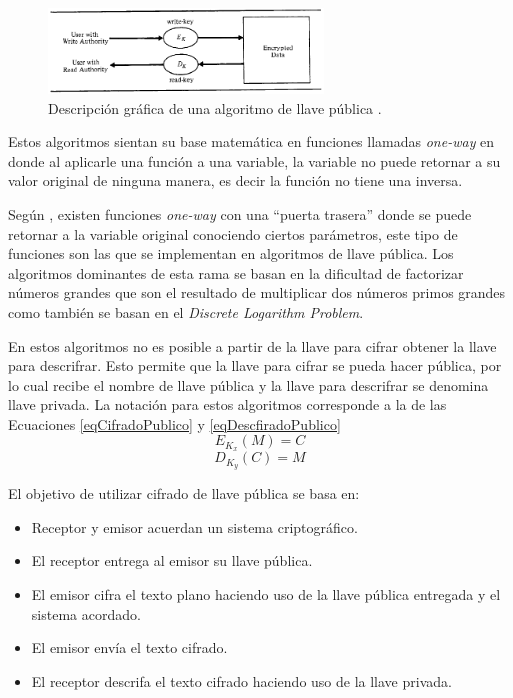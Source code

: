 \begin{figure}
	\centering
	\includegraphics[width=0.65\textwidth]{./images/figPublicKeyAlgorithm}
	\caption{Descripción gráfica de una algoritmo de llave pública \citep{denning}.}
	\label{figPublicKeyAlgorithm}
\end{figure}

Estos algoritmos sientan su base matemática en funciones llamadas \textit{one-way} en donde al aplicarle una función a una variable, la variable no puede retornar a su valor original de ninguna manera, es decir la función no tiene una inversa. 

Según \cite{bruce}, existen funciones \textit{one-way} con una ``puerta trasera'' donde se puede retornar a la variable original conociendo ciertos parámetros, este tipo de funciones son las que se implementan en algoritmos de llave pública. Los algoritmos dominantes de esta rama se basan en la dificultad de factorizar números grandes que son el resultado de multiplicar dos números primos grandes como también se basan en el \textit{Discrete Logarithm Problem}.

En estos algoritmos no es posible a partir de la llave para cifrar obtener la llave para descrifrar. Esto permite que la llave para cifrar se pueda hacer pública, por lo cual recibe el nombre de llave pública y la llave para descrifrar se denomina llave privada. La notación para estos algoritmos corresponde a la de las Ecuaciones \eqref{eqCifradoPublico} y \eqref{eqDescfiradoPublico}
\begin{equation} \label{eqCifradoPublico}
E_{K_x} (M) = C
\end{equation}
\begin{equation} \label{eqDescfiradoPublico}
D_{K_y} (C) = M
\end{equation}

El objetivo de utilizar cifrado de llave pública se basa en:
\begin{itemize}
\item Receptor y emisor acuerdan un sistema criptográfico.
\item El receptor entrega al emisor su llave pública.
\item El emisor cifra el texto plano haciendo uso de la llave pública entregada y el sistema acordado.
\item El emisor envía el texto cifrado.
\item El receptor descrifa el texto cifrado haciendo uso de la llave privada.
\end{itemize}

